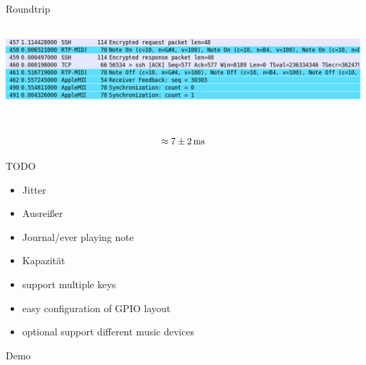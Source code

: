 \begin{frame}{Roundtrip}
	\includegraphics[height=4cm]{img/wire.jpg}
	
	\[\approx 7\pm2\text{\,ms}\]
	
\end{frame}

\begin{frame}{TODO}
	\begin{itemize}
		\item Jitter
		\item Ausreißer
		\item Journal/ever playing note
		\item Kapazität
		\item support multiple keys
		\item easy configuration of GPIO layout
		\item optional support different music devices
	\end{itemize}
\end{frame}

\begin{frame}
	\centering
	\Huge Demo
\end{frame}
